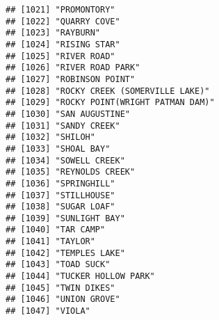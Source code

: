 \documentclass[
]{article}
\begin{document}
\begin{verbatim}
## [1021] "PROMONTORY"                                                                          
## [1022] "QUARRY COVE"                                                                         
## [1023] "RAYBURN"                                                                             
## [1024] "RISING STAR"                                                                         
## [1025] "RIVER ROAD"                                                                          
## [1026] "RIVER ROAD PARK"                                                                     
## [1027] "ROBINSON POINT"                                                                      
## [1028] "ROCKY CREEK (SOMERVILLE LAKE)"                                                       
## [1029] "ROCKY POINT(WRIGHT PATMAN DAM)"                                                      
## [1030] "SAN AUGUSTINE"                                                                       
## [1031] "SANDY CREEK"                                                                         
## [1032] "SHILOH"                                                                              
## [1033] "SHOAL BAY"                                                                           
## [1034] "SOWELL CREEK"                                                                        
## [1035] "REYNOLDS CREEK"                                                                      
## [1036] "SPRINGHILL"                                                                          
## [1037] "STILLHOUSE"                                                                          
## [1038] "SUGAR LOAF"                                                                          
## [1039] "SUNLIGHT BAY"                                                                        
## [1040] "TAR CAMP"                                                                            
## [1041] "TAYLOR"                                                                              
## [1042] "TEMPLES LAKE"                                                                        
## [1043] "TOAD SUCK"                                                                           
## [1044] "TUCKER HOLLOW PARK"                                                                  
## [1045] "TWIN DIKES"                                                                          
## [1046] "UNION GROVE"                                                                         
## [1047] "VIOLA"                                                                               

\end{verbatim}
\end{document}
